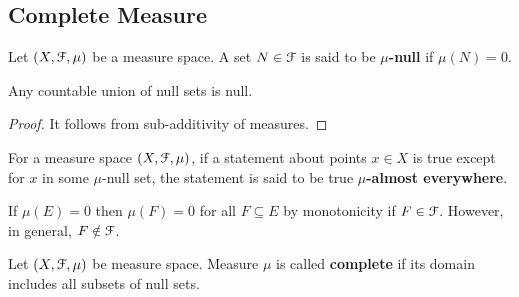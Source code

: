 \documentclass[a4paper,english,12pt]{article}
\begin{document}
\subsection{Complete Measure}

\begin{defn} Let $(X, \mathcal{F}, \mu)$ be a measure space. A set $N \in \mathcal{F}$ is said to be \textbf{$\mu$-null} if $\mu(N) = 0$.
\end{defn}
\begin{lem} Any countable union of null sets is null.
\end{lem}
\begin{proof} It follows from sub-additivity of measures.
\end{proof}
\begin{defn} For a measure space $(X, \mathcal{F}, \mu)$, if a statement about points $x \in X$ is true except for $x$ in some $\mu$-null set, the statement is said to be true \textbf{$\mu$-almost everywhere}.
\end{defn}

\begin{rem} If $\mu(E) = 0$ then $\mu(F) = 0$ for all $F \subseteq E$ by monotonicity if $F \in \mathcal{F}$. However, in general, $F \notin \mathcal{F}$.
\end{rem}
\begin{defn} Let $(X, \mathcal{F}, \mu)$ be measure space. Measure $\mu$ is called \textbf{complete} if its domain includes all subsets of null sets.
\end{defn}
\end{document}
